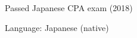 

\begin{cventries}

\cventrysimple
    {Passed Japanese CPA exam (2018)}  %
    {} %
    {}

\cventrysimple
    {Language: Japanese (native)}  %
    {} %
    {}



\end{cventries}
